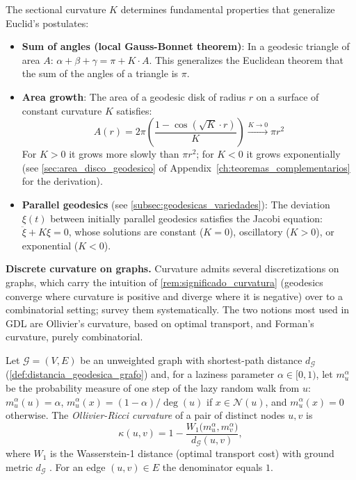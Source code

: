 \begin{remark}\label{rem:significado_curvatura}
The sectional curvature $K$ determines fundamental properties that generalize Euclid's postulates:
\begin{itemize}
    \item \textbf{Sum of angles (local Gauss-Bonnet theorem)}: In a geodesic triangle
          of area $A$: $\alpha + \beta + \gamma = \pi + K \cdot A$. This generalizes the
          Euclidean theorem that the sum of the angles of a triangle is $\pi$.
    \item \textbf{Area growth}: The area of a geodesic disk of radius $r$ on a surface of constant curvature $K$ satisfies:
          \[
          A(r) = 2\pi \left( \frac{1 - \cos(\sqrt{K} \cdot r)}{K} \right) \xrightarrow{K \to 0} \pi r^2
          \]
          For $K > 0$ it grows more slowly than $\pi r^2$; for $K < 0$ it grows exponentially (see \autoref{sec:area_disco_geodesico} of Appendix~\ref{ch:teoremas_complementarios} for the derivation).
    \item \textbf{Parallel geodesics} (see \autoref{subsec:geodesicas_variedades}):
          The deviation $\xi(t)$ between initially parallel geodesics satisfies the
          Jacobi equation: $\ddot{\xi} + K\xi = 0$, whose solutions are constant ($K=0$),
          oscillatory ($K>0$), or exponential ($K<0$).
\end{itemize}
\end{remark}

\textbf{Discrete curvature on graphs.} Curvature admits several discretizations on graphs, which carry the intuition of \autoref{rem:significado_curvatura} (geodesics converge where curvature is positive and diverge where it is negative) over to a combinatorial setting; \citet{yadav2025curvatureroadmap} survey them systematically. The two notions most used in \gls{GDL} are Ollivier's curvature, based on optimal transport, and Forman's curvature, purely combinatorial.

\begin{definition}\label{def:curvatura_ollivier}
Let $\mathcal{G} = (V, E)$ be an unweighted graph with shortest-path distance $d_{\mathcal{G}}$ (\autoref{def:distancia_geodesica_grafo}) and, for a laziness parameter $\alpha \in [0,1)$, let $m_u^{\alpha}$ be the probability measure of one step of the lazy random walk from $u$: $m_u^{\alpha}(u) = \alpha$, $m_u^{\alpha}(x) = (1-\alpha)/\deg(u)$ if $x \in \mathcal{N}(u)$, and $m_u^{\alpha}(x) = 0$ otherwise. The \textit{Ollivier-Ricci curvature} of a pair of distinct nodes $u, v$ is
\[
\kappa(u,v) = 1 - \frac{W_1\bigl(m_u^{\alpha}, m_v^{\alpha}\bigr)}{d_{\mathcal{G}}(u,v)},
\]
where $W_1$ is the Wasserstein-1 distance (optimal transport cost) with ground metric $d_{\mathcal{G}}$ \citep{ollivier2009ricci}. For an edge $(u,v) \in E$ the denominator equals $1$.
\end{definition}

